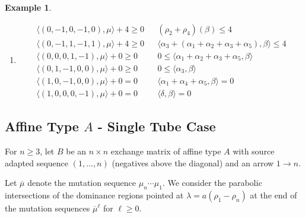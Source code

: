 \documentclass{amsart}
\newtheorem{example}[theorem]{Example}
\numberwithin{theorem}{section}
\begin{document}
\begin{example}
\begin{enumerate}
    \item 
      \begin{align*}
        \langle (0, -1, 0,-1, 0), \mu \rangle + 4 \geq 0 && (\rho_2+\rho_4)(\beta) \leq 4\\
        \langle (0, -1, 1,-1, 1), \mu \rangle + 4 \geq 0 && \langle \alpha_3+(\alpha_1+\alpha_2+\alpha_3+\alpha_5), \beta \rangle \leq 4\\
        \langle (0, 0, 0, 1, -1), \mu \rangle + 0 \geq 0 && 0 \leq \langle \alpha_1+\alpha_2+\alpha_3+\alpha_5, \beta \rangle\\
        \langle (0, 1, -1, 0, 0), \mu \rangle + 0 \geq 0 && 0 \leq \langle \alpha_3, \beta \rangle\\
        \langle (1, 0, -1, 0, 0), \mu \rangle + 0 = 0 && \langle \alpha_1+\alpha_4+\alpha_5, \beta \rangle = 0\\
        \langle (1, 0, 0, 0, -1), \mu \rangle + 0 = 0 && \langle \delta, \beta \rangle = 0
      \end{align*}
  \end{enumerate}
  
\end{example}

\subsection{Affine Type $A$ - Single Tube Case}

  For $n\ge3$, let $B$ be an $n\times n$ exchange matrix of affine type $A$ with source adapted sequence $(1,\ldots,n)$ (negatives above the diagonal) and an arrow $1\to n$.

  Let $\overline{\mu}$ denote the mutation sequence $\mu_n\cdots\mu_1$.
  We consider the parabolic intersections of the dominance regions pointed at $\lambda=a(\rho_1-\rho_n)$ at the end of the mutation sequences $\overline{\mu}^\ell$ for $\ell\ge0$.
\end{document}
